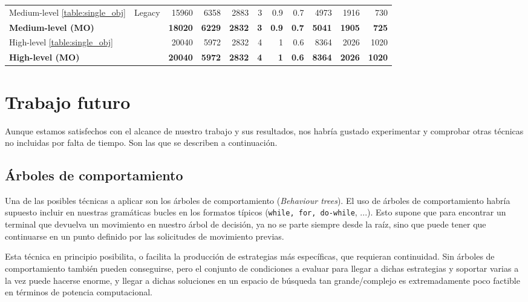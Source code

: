 \begin{table}[tb]
\begin{tabular}{|l|c|r|r|r|r|r|r|r|r|r|}
{Medium-level \ref{table:single_obj}} & \multirow{4}{*}{Legacy} & {15960} & {6358} & {2883} & {3} & {0.9} & {0.7} & {4973} & {1916} & {730} \\ \cline{1-1} \cline{3-11} 
\textbf{Medium-level (MO)} &  & \textbf{18020} & \textbf{6229} & \textbf{2832} & \textbf{3} & \textbf{0.9} & \textbf{0.7} & \textbf{5041} & \textbf{1905} & \textbf{725} \\ \cline{1-1} \cline{3-11} 
{High-level \ref{table:single_obj}} &  & {20040} & {5972} & {2832} & {4} & {1} & {0.6} & {8364} & {2026} & {1020} \\ \cline{1-1} \cline{3-11} 
\textbf{High-level (MO)} &  & \textbf{20040} & \textbf{5972} & \textbf{2832} & \textbf{4} & \textbf{1} & \textbf{0.6} & \textbf{8364} & \textbf{2026} & \textbf{1020} \\ \hline
\end{tabular}
\end{table}

\section{Trabajo futuro}
Aunque estamos satisfechos con el alcance de nuestro trabajo y sus resultados, nos habría gustado experimentar y comprobar otras técnicas no incluidas por falta de tiempo. Son las que se describen a continuación.

\subsection{Árboles de comportamiento}
Una de las posibles técnicas a aplicar son los árboles de comportamiento (\textit{Behaviour trees}). 
El uso de árboles de comportamiento habría supuesto incluir en nuestras gramáticas bucles en los formatos típicos (\texttt{while, for, do-while}, ...). Esto supone que para encontrar un terminal que devuelva un movimiento en nuestro árbol de decisión, ya no se parte siempre desde la raíz, sino que puede tener que continuarse en un punto definido por las solicitudes de movimiento previas.

Esta técnica en principio posibilita, o facilita la producción de estrategias más específicas, que requieran continuidad. Sin árboles de comportamiento también pueden conseguirse, pero el conjunto de condiciones a evaluar para llegar a dichas estrategias y soportar varias a la vez puede hacerse enorme, y llegar a dichas soluciones en un espacio de búsqueda tan grande/complejo es extremadamente poco factible en términos de potencia computacional.

